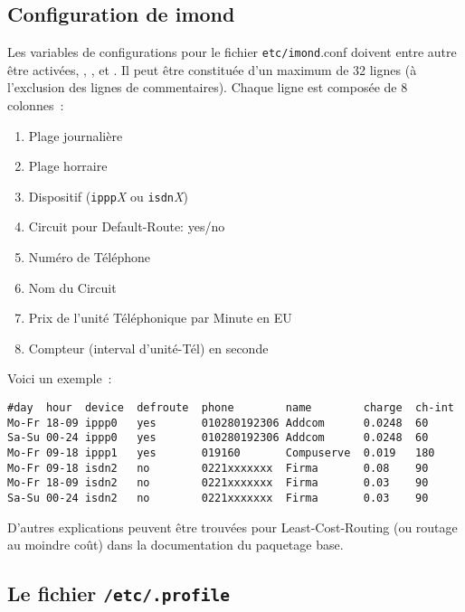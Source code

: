 \subsection{Configuration de imond}

Les variables de configurations pour le fichier \texttt{etc/imond}.conf doivent entre
autre être activées, , , 
et . Il peut être constituée d'un maximum de 32 lignes
(à l'exclusion des lignes de commentaires). Chaque ligne est composée de 8 colonnes~:

\begin{enumerate}
\item  Plage journalière
\item  Plage horraire
\item  Dispositif (\texttt{ippp}\emph{X} ou \texttt{isdn}\emph{X})
\item  Circuit pour Default-Route: \og{}yes\fg{}/\og{}no\fg{}
\item  Numéro de Téléphone
\item  Nom du Circuit
\item  Prix de l'unité Téléphonique par Minute en EU
\item  Compteur (interval d'unité-Tél) en seconde
\end{enumerate}

    Voici un exemple~:

\begin{example}
\begin{verbatim}
#day  hour  device  defroute  phone        name        charge  ch-int
Mo-Fr 18-09 ippp0   yes       010280192306 Addcom      0.0248  60
Sa-Su 00-24 ippp0   yes       010280192306 Addcom      0.0248  60
Mo-Fr 09-18 ippp1   yes       019160       Compuserve  0.019   180
Mo-Fr 09-18 isdn2   no        0221xxxxxxx  Firma       0.08    90
Mo-Fr 18-09 isdn2   no        0221xxxxxxx  Firma       0.03    90
Sa-Su 00-24 isdn2   no        0221xxxxxxx  Firma       0.03    90
\end{verbatim}
\end{example}

    D'autres explications peuvent être trouvées pour Least-Cost-Routing (ou routage au
	moindre coût) dans la documentation du paquetage \og{}base\fg{}.


\subsection{Le fichier \texttt{/etc/.profile}}

